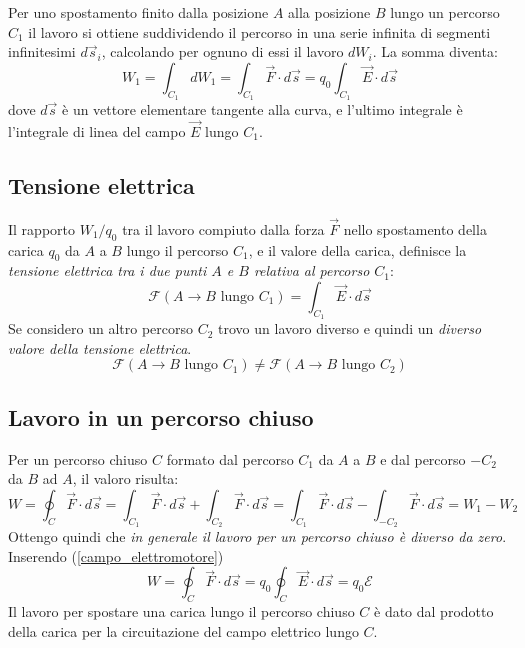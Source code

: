 \documentclass[class=book, crop=false, oneside, 12pt]{standalone}
\begin{document}
Per uno spostamento finito dalla posizione \(A\) alla posizione \(B\) lungo un percorso \(C_1\) il lavoro si ottiene suddividendo il percorso in una serie infinita di segmenti infinitesimi \(d \overrightarrow{s}_i\), calcolando per ognuno di essi il lavoro \(dW_i\).
La somma diventa:
\begin{equation} \label{lavoro_elettrostatico}
    W_1 = \int_{C_1} d W_1 = \int_{C_1} \overrightarrow{F} \cdot d \overrightarrow{s} = q_0 \int_{C_1} \overrightarrow{E} \cdot d \overrightarrow{s}
\end{equation}
dove \(d \overrightarrow{s}\) è un vettore elementare tangente alla curva, e l'ultimo integrale è l'integrale di linea del campo \(\overrightarrow{E}\) lungo \(C_1\).

\subsection{Tensione elettrica}

Il rapporto \(W_1 / q_0\) tra il lavoro compiuto dalla forza \(\overrightarrow{F}\) nello spostamento della carica \(q_0\) da \(A\) a \(B\) lungo il percorso \(C_1\), e il valore della carica, definisce la \emph{tensione elettrica tra i due punti \(A\) e \(B\) relativa al percorso \(C_1\)}:
\begin{equation}
    \mathcal{F} \left(A \rightarrow B \text{ lungo } C_1\right) = \int_{C_1} \overrightarrow{E} \cdot d \overrightarrow{s}
\end{equation}
Se considero un altro percorso \(C_2\) trovo un lavoro diverso e quindi un \emph{diverso valore della tensione elettrica}.
\begin{equation*}
    \mathcal{F} \left(A \rightarrow B \text{ lungo } C_1\right) \neq \mathcal{F} \left(A \rightarrow B \text{ lungo } C_2\right)
\end{equation*}

\subsection{Lavoro in un percorso chiuso}

Per un percorso chiuso \(C\) formato dal percorso \(C_1\) da \(A\) a \(B\) e dal percorso \(-C_2\) da \(B\) ad \(A\), il valoro risulta:
\begin{equation*}
    W = \oint_{C} \overrightarrow{F} \cdot d \overrightarrow{s} = \int_{C_1} \overrightarrow{F} \cdot d \overrightarrow{s} + \int_{C_2} \overrightarrow{F} \cdot d \overrightarrow{s} = \int_{C_1} \overrightarrow{F} \cdot d \overrightarrow{s} - \int_{-C_2} \overrightarrow{F} \cdot d \overrightarrow{s} = W_1 - W_2
\end{equation*}
Ottengo quindi che \emph{in generale il lavoro per un percorso chiuso è diverso da zero}. Inserendo (\ref{campo_elettromotore})
\begin{equation}
    W = \oint_{C} \overrightarrow{F} \cdot d \overrightarrow{s} = q_0 \oint_{C} \overrightarrow{E} \cdot d \overrightarrow{s} = q_0 \mathcal{E}
\end{equation}
Il lavoro per spostare una carica lungo il percorso chiuso \(C\) è dato dal prodotto della carica per la circuitazione del campo elettrico lungo \(C\).
\end{document}
